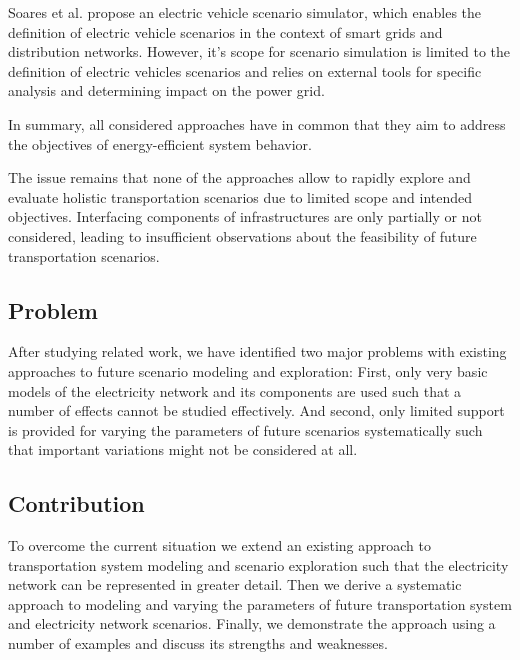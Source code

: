 Soares et al. \cite{soares2012electric} propose an electric vehicle scenario simulator, which enables the definition of electric vehicle scenarios in the context of smart grids and distribution networks.
However, it's scope for scenario simulation is limited to the definition of electric vehicles scenarios and relies on external tools for specific analysis and determining impact on the power grid.

In summary, all considered approaches have in common that they aim to address the objectives of energy-efficient system behavior.

The issue remains that none of the approaches allow to rapidly explore and evaluate holistic transportation scenarios due to limited scope and intended objectives. Interfacing components of infrastructures are only partially or not considered, leading to insufficient observations about the feasibility of future transportation scenarios.

\subsection{Problem}

After studying related work, we have identified two major problems with existing approaches to future scenario modeling and exploration: First, only very basic models of the electricity network and its components are used such that a number of effects cannot be studied effectively. And second, only limited support is provided for varying the parameters of future scenarios systematically such that important variations might not be considered at all.

\subsection{Contribution}

To overcome the current situation we extend an existing approach to transportation system modeling and scenario exploration such that the electricity network can be represented in greater detail. Then we derive a systematic approach to modeling and varying the parameters of future transportation system and electricity network scenarios. Finally, we demonstrate the approach using a number of examples and discuss its strengths and weaknesses.



